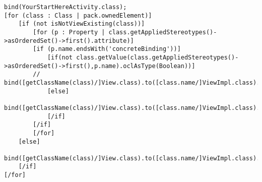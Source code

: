 \lstset{language=OCL}
\begin{lstlisting}[caption={Auszug aus der Generierung des bind-Befehls}]
bind(YourStartHereActivity.class);   
[for (class : Class | pack.ownedElement)]
	[if (not isNotViewExisting(class))]
		[for (p : Property | class.getAppliedStereotypes()->asOrderedSet()->first().attribute)]
		[if (p.name.endsWith('concreteBinding'))]
			[if(not class.getValue(class.getAppliedStereotypes()->asOrderedSet()->first(),p.name).oclAsType(Boolean))]
		// bind([getClassName(class)/]View.class).to([class.name/]ViewImpl.class).in(Singleton.class);
			[else]
		bind([getClassName(class)/]View.class).to([class.name/]ViewImpl.class).in(Singleton.class);
			[/if]
		[/if]
		[/for]
	[else]
		bind([getClassName(class)/]View.class).to([class.name/]ViewImpl.class).in(Singleton.class);
	[/if]	
[/for]
\end{lstlisting}

